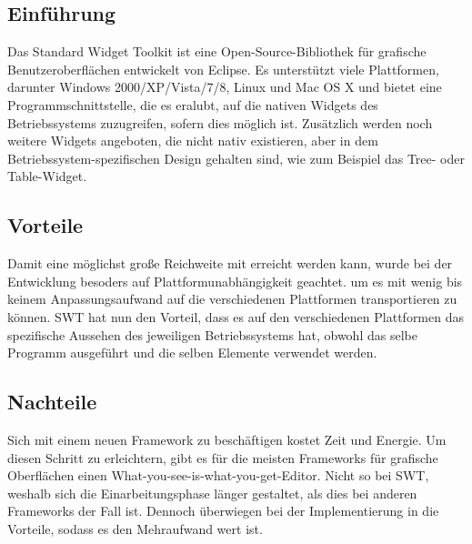 \subsection{Einführung}
Das Standard Widget Toolkit ist eine Open-Source-Bibliothek für grafische Benutzeroberflächen entwickelt von Eclipse. Es unterstützt viele Plattformen, darunter Windows 2000/XP/Vista/7/8, Linux und Mac OS X und bietet eine Programmschnittstelle, die es eralubt, auf die nativen Widgets des Betriebssystems zuzugreifen, sofern dies möglich ist. Zusätzlich werden noch weitere Widgets angeboten, die nicht nativ existieren, aber in dem Betriebssystem-spezifischen Design gehalten sind, wie zum Beispiel das Tree- oder Table-Widget.

%
%

\subsection{Vorteile}
Damit eine möglichst große Reichweite mit \sblit erreicht werden kann, wurde bei
der Entwicklung besoders auf Plattformunabhängigkeit geachtet. um es mit wenig
bis keinem Anpassungsaufwand auf die verschiedenen Plattformen transportieren zu
können. SWT hat nun den Vorteil, dass es auf den verschiedenen Plattformen das
spezifische Aussehen des jeweiligen Betriebssystems hat, obwohl das selbe
Programm ausgeführt und die selben Elemente verwendet werden.

\subsection{Nachteile}
Sich mit einem neuen Framework zu beschäftigen kostet Zeit und Energie. Um
diesen Schritt zu erleichtern, gibt es für die meisten Frameworks für grafische
Oberflächen einen What-you-see-is-what-you-get-Editor. Nicht so bei SWT, weshalb
sich die Einarbeitungsphase länger gestaltet, als dies bei anderen Frameworks
der Fall ist. Dennoch überwiegen bei der Implementierung in \sblit die Vorteile,
sodass es den Mehraufwand wert ist.

%
%
